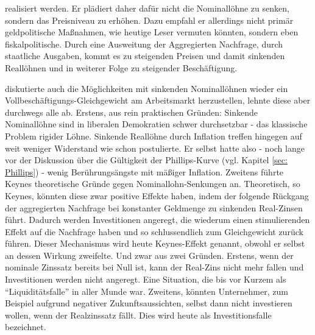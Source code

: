 realisiert werden. Er plädiert daher dafür nicht die Nominallöhne zu senken, sondern das Preisniveau zu erhöhen. Dazu empfahl er allerdings nicht primär geldpolitische Maßnahmen, wie heutige Leser vermuten könnten, sondern eben fiskalpolitische. Durch eine Ausweitung der Aggregierten Nachfrage, durch staatliche Ausgaben, kommt es zu steigenden Preisen und damit sinkenden Reallöhnen und in weiterer Folge zu steigender Beschäftigung.

\textcite{Keynes1936} diskutierte auch die Möglichkeiten mit sinkenden Nominallöhnen wieder ein Vollbeschäftigungs-Gleichgewicht am Arbeitsmarkt herzustellen, lehnte diese aber durchwegs alle ab. Erstens, aus rein praktischen Gründen: Sinkende Nominallöhne sind in liberalen Demokratien schwer durchsetzbar - das klassische Problem rigider Löhne. Sinkende Reallöhne durch Inflation treffen hingegen auf weit weniger Widerstand wie \textcite[S. 14]{Keynes1936} schon postulierte. Er selbst hatte also - noch lange vor der Diskussion über die Gültigkeit der Phillips-Kurve (vgl. Kapitel \ref{sec: Phillips}) - wenig Berührungsängste mit mäßiger Inflation. Zweitens führte Keynes theoretische Gründe gegen Nominallohn-Senkungen an. Theoretisch, so Keynes, könnten diese zwar positive Effekte haben, indem der folgende Rückgang der aggregierten Nachfrage bei konstanter Geldmenge zu sinkenden Real-Zinsen führt. Dadurch werden Investitionen angeregt, die wiederum einen stimulierenden Effekt auf die Nachfrage haben und so schlussendlich zum Gleichgewicht zurück führen. Dieser Mechanismus wird heute Keynes-Effekt genannt, obwohl er selbst an dessen Wirkung zweifelte. Und zwar aus zwei Gründen. Erstens, wenn der nominale Zinssatz bereits bei Null ist, kann der Real-Zins nicht mehr fallen und Investitionen werden nicht angeregt. Eine Situation, die bis vor Kurzem als "`Liquiditätsfalle"' in aller Munde war. Zweitens, könnten Unternehmer, zum Beispiel aufgrund negativer Zukunftsaussichten, selbst dann nicht investieren wollen, wenn der Realzinssatz fällt. Dies wird heute als Investitionsfalle bezeichnet.

